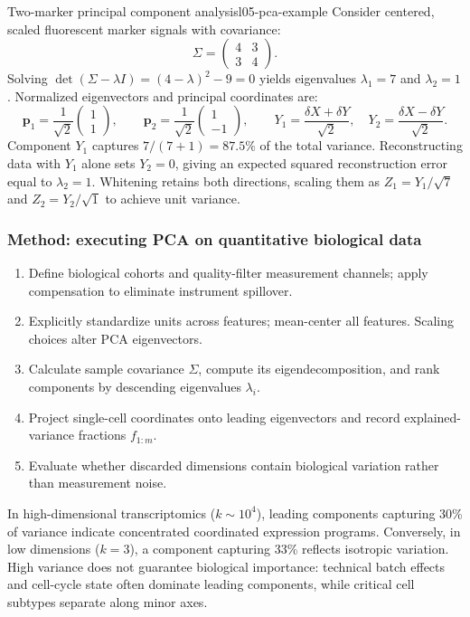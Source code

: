 \begin{example}{Two-marker principal component analysis}{l05-pca-example}
Consider centered, scaled fluorescent marker signals with covariance:
\begin{equation}
\Sigma=\begin{pmatrix}4&3\\3&4\end{pmatrix}.
\label{eq:l05-pca-example-matrix}
\end{equation}
Solving $\det(\Sigma-\lambda I)=(4-\lambda)^2-9=0$ yields eigenvalues $\lambda_1=7$ and $\lambda_2=1$. Normalized eigenvectors and principal coordinates are:
\begin{equation}
\mathbf p_1=\frac1{\sqrt2}\begin{pmatrix}1\\1\end{pmatrix},\qquad
\mathbf p_2=\frac1{\sqrt2}\begin{pmatrix}1\\-1\end{pmatrix},\qquad
Y_1=\frac{\delta X+\delta Y}{\sqrt2},\quad
Y_2=\frac{\delta X-\delta Y}{\sqrt2}.
\label{eq:l05-pca-example-vectors}
\end{equation}
Component $Y_1$ captures $7/(7+1)=87.5\%$ of the total variance. Reconstructing data with $Y_1$ alone sets $Y_2=0$, giving an expected squared reconstruction error equal to $\lambda_2=1$. Whitening retains both directions, scaling them as $Z_1=Y_1/\sqrt7$ and $Z_2=Y_2/\sqrt1$ to achieve unit variance.
\end{example}

\subsubsection*{Method: executing PCA on quantitative biological data}
\begin{enumerate}
\item Define biological cohorts and quality-filter measurement channels; apply compensation to eliminate instrument spillover.
\item Explicitly standardize units across features; mean-center all features. Scaling choices alter PCA eigenvectors.
\item Calculate sample covariance $\Sigma$, compute its eigendecomposition, and rank components by descending eigenvalues $\lambda_i$.
\item Project single-cell coordinates onto leading eigenvectors and record explained-variance fractions $f_{1:m}$.
\item Evaluate whether discarded dimensions contain biological variation rather than measurement noise.
\end{enumerate}
In high-dimensional transcriptomics ($k \sim 10^4$), leading components capturing 30\% of variance indicate concentrated coordinated expression programs. Conversely, in low dimensions ($k=3$), a component capturing 33\% reflects isotropic variation. High variance does not guarantee biological importance: technical batch effects and cell-cycle state often dominate leading components, while critical cell subtypes separate along minor axes.

